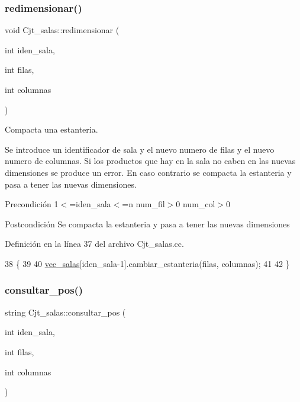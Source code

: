 \subsubsection{\texorpdfstring{redimensionar()}{redimensionar()}}
{\footnotesize\ttfamily void Cjt\+\_\+salas\+::redimensionar (\begin{DoxyParamCaption}\item[{int}]{iden\+\_\+sala,  }\item[{int}]{filas,  }\item[{int}]{columnas }\end{DoxyParamCaption})}



Compacta una estanteria. 

Se introduce un identificador de sala y el nuevo numero de filas y el nuevo numero de columnas. Si los productos que hay en la sala no caben en las nuevas dimensiones se produce un error. En caso contrario se compacta la estanteria y pasa a tener las nuevas dimensiones. \begin{DoxyPrecond}{Precondición}
1$<$=iden\+\_\+sala$<$=n num\+\_\+fil$>$0 num\+\_\+col$>$0 
\end{DoxyPrecond}
\begin{DoxyPostcond}{Postcondición}
Se compacta la estanteria y pasa a tener las nuevas dimensiones 
\end{DoxyPostcond}


Definición en la línea 37 del archivo Cjt\+\_\+salas.\+cc.


\begin{DoxyCode}
38 \{
39   
40   \hyperlink{class_cjt__salas_a3f130cc8bab35f449de8be69283af09e}{vec\_salas}[iden\_sala-1].cambiar\_estanteria(filas, columnas);
41 
42 \}
\end{DoxyCode}
\mbox{\label{class_cjt__salas_a7e06b122fbbee58f24b8938bc2975b16}} 
\subsubsection{\texorpdfstring{consultar\+\_\+pos()}{consultar\_pos()}}
{\footnotesize\ttfamily string Cjt\+\_\+salas\+::consultar\+\_\+pos (\begin{DoxyParamCaption}\item[{int}]{iden\+\_\+sala,  }\item[{int}]{filas,  }\item[{int}]{columnas }\end{DoxyParamCaption})}



